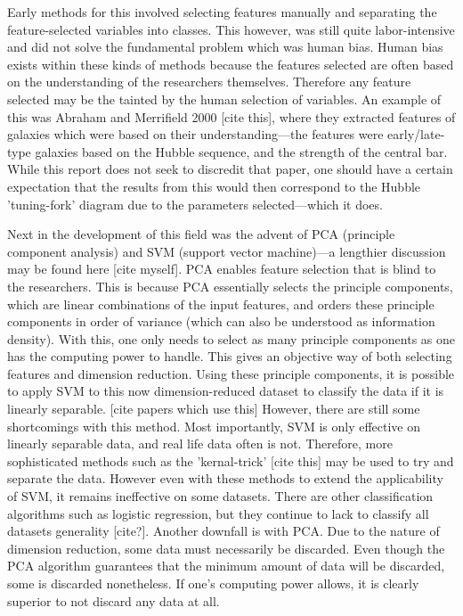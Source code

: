 \documentclass[a4paper,fleqn,usenatbib]{mnras}
\begin{document}
Early methods for this involved selecting features manually and separating the feature-selected variables into classes. This however, was still quite labor-intensive and did not solve the fundamental problem which was human bias. Human bias exists within these kinds of methods because the features selected are often based on the understanding of the researchers themselves. Therefore any feature selected may be the tainted by the human selection of variables. An example of this was Abraham and Merrifield 2000 [cite this], where they extracted features of galaxies which were based on their understanding---the features were early/late-type galaxies based on the Hubble sequence, and the strength of the central bar. While this report does not seek to discredit that paper, one should have a certain expectation that the results from this would then correspond to the Hubble 'tuning-fork' diagram due to the parameters selected---which it does. 

Next in the development of this field was the advent of PCA (principle component analysis) and SVM (support vector machine)---a lengthier discussion may be found here [cite myself]. PCA enables feature selection that is blind to the researchers. This is because PCA essentially selects the principle components, which are linear combinations of the input features, and orders these principle components in order of variance (which can also be understood as information density). With this, one only needs to select as many principle components as one has the computing power to handle. This gives an objective way of both selecting features and dimension reduction. Using these principle components, it is possible to apply SVM to this now dimension-reduced dataset to classify the data if it is linearly separable. [cite papers which use this] However, there are still some shortcomings with this method. Most importantly, SVM is only effective on linearly separable data, and real life data often is not. Therefore, more sophisticated methods such as the 'kernal-trick' [cite this] may be used to try and separate the data. However even with these methods to extend the applicability of SVM, it remains ineffective on some datasets. There are other classification algorithms such as logistic regression, but they continue to lack to classify all datasets generality [cite?]. Another downfall is with PCA. Due to the nature of dimension reduction, some data must necessarily be discarded. Even though the PCA algorithm guarantees that the minimum amount of data will be discarded, some is discarded nonetheless. If one's computing power allows, it is clearly superior to not discard any data at all. 
\end{document}
